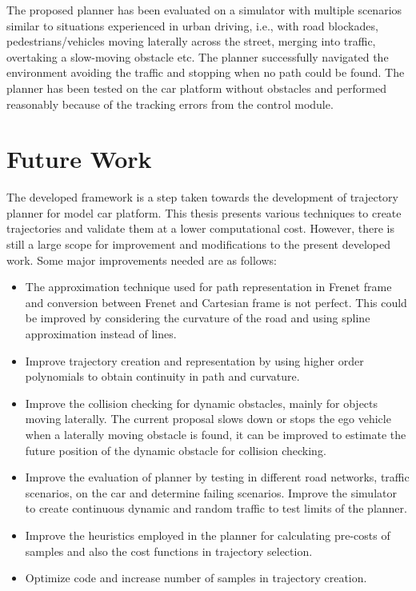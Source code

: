The proposed planner has been evaluated on a simulator with multiple scenarios similar to situations experienced in urban driving, i.e., with road blockades, pedestrians/vehicles moving laterally across the street, merging into traffic, overtaking a slow-moving obstacle etc. The planner successfully navigated the environment avoiding the traffic and stopping when no path could be found. The planner has been tested on the car platform without obstacles and performed reasonably because of the tracking errors from the control module.

\section{Future Work}
The developed framework is a step taken towards the development of trajectory planner for model car platform. This thesis presents various techniques to create trajectories and validate them at a lower computational cost. However, there is still a large scope for improvement and modifications to the present developed work. Some major improvements needed are as follows:

\begin{itemize}
	\item The approximation technique used for path representation in Frenet frame and conversion between Frenet and Cartesian frame is not perfect. This could be improved by considering the curvature of the road and using spline approximation instead of lines.
	\item Improve trajectory creation and representation by using higher order polynomials to obtain continuity in path and curvature.
	\item Improve the collision checking for dynamic obstacles, mainly for objects moving laterally. The current proposal slows down or stops the ego vehicle when a laterally moving obstacle is found, it can be improved to estimate the future position of the dynamic obstacle for collision checking.
	\item Improve the evaluation of planner by testing in different road networks, traffic scenarios, on the car and determine failing scenarios. Improve the simulator to create continuous dynamic and random traffic to test limits of the planner.
	\item Improve the heuristics employed in the planner for calculating pre-costs of samples and also the cost functions in trajectory selection.
	\item Optimize code and increase number of samples in trajectory creation.
	
\end{itemize}


